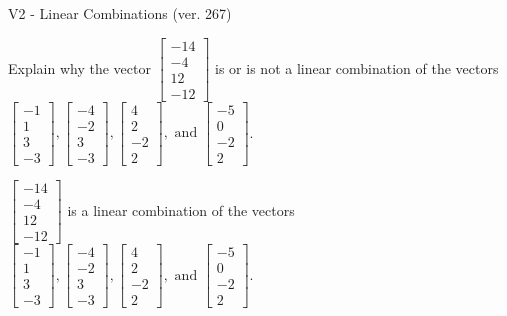 \begin{exercise}
  \begin{exerciseTitle}V2 - Linear Combinations (ver. 267)\end{exerciseTitle}
  \begin{exerciseStatement}
    Explain why the vector \(\left[\begin{array}{c}
-14 \\
-4 \\
12 \\
-12
\end{array}\right]\)  is or is not a linear 
	combination of the vectors \(\left[\begin{array}{c}
-1 \\
1 \\
3 \\
-3
\end{array}\right] , \left[\begin{array}{c}
-4 \\
-2 \\
3 \\
-3
\end{array}\right] , \left[\begin{array}{c}
4 \\
2 \\
-2 \\
2
\end{array}\right] , \text{ and } \left[\begin{array}{c}
-5 \\
0 \\
-2 \\
2
\end{array}\right]\).
	


  \end{exerciseStatement}
  \begin{exerciseAnswer}
   \(\left[\begin{array}{c}
-14 \\
-4 \\
12 \\
-12
\end{array}\right]\) 
  	 is  
	a linear combination of the vectors \(\left[\begin{array}{c}
-1 \\
1 \\
3 \\
-3
\end{array}\right] , \left[\begin{array}{c}
-4 \\
-2 \\
3 \\
-3
\end{array}\right] , \left[\begin{array}{c}
4 \\
2 \\
-2 \\
2
\end{array}\right] , \text{ and } \left[\begin{array}{c}
-5 \\
0 \\
-2 \\
2
\end{array}\right]\).


\end{exerciseAnswer}
\end{exercise}
